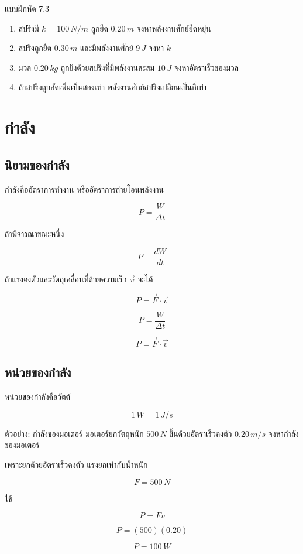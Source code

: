 \begin{exercisebox}{แบบฝึกหัด 7.3}
\begin{enumerate}
    \item สปริงมี $k=100\,\si{N/m}$ ถูกยืด $0.20\,\si{m}$ จงหาพลังงานศักย์ยืดหยุ่น
    \item สปริงถูกยืด $0.30\,\si{m}$ และมีพลังงานศักย์ $9\,\si{J}$ จงหา $k$
    \item มวล $0.20\,\si{kg}$ ถูกยิงด้วยสปริงที่มีพลังงานสะสม $10\,\si{J}$ จงหาอัตราเร็วของมวล
    \item ถ้าสปริงถูกอัดเพิ่มเป็นสองเท่า พลังงานศักย์สปริงเปลี่ยนเป็นกี่เท่า
\end{enumerate}
\end{exercisebox}

\section{กำลัง}

\subsection{นิยามของกำลัง}

กำลังคืออัตราการทำงาน หรืออัตราการถ่ายโอนพลังงาน

\[
P=\frac{W}{\Delta t}
\]

ถ้าพิจารณาขณะหนึ่ง

\[
P=\frac{dW}{dt}
\]

ถ้าแรงคงตัวและวัตถุเคลื่อนที่ด้วยความเร็ว $\vec{v}$ จะได้

\[
P=\vec{F}\cdot \vec{v}
\]

\begin{tcolorbox}[title=กำลัง]
\[
P=\frac{W}{\Delta t}
\]

\[
P=\vec{F}\cdot \vec{v}
\]
\end{tcolorbox}

\subsection{หน่วยของกำลัง}

หน่วยของกำลังคือวัตต์

\[
1\,\si{W}=1\,\si{J/s}
\]

\begin{examplebox}{ตัวอย่าง: กำลังของมอเตอร์}
มอเตอร์ยกวัตถุหนัก $500\,\si{N}$ ขึ้นด้วยอัตราเร็วคงตัว $0.20\,\si{m/s}$ จงหากำลังของมอเตอร์

เพราะยกด้วยอัตราเร็วคงตัว แรงยกเท่ากับน้ำหนัก

\[
F=500\,\si{N}
\]

ใช้

\[
P=Fv
\]

\[
P=(500)(0.20)
\]

\[
P=100\,\si{W}
\]
\end{examplebox}

